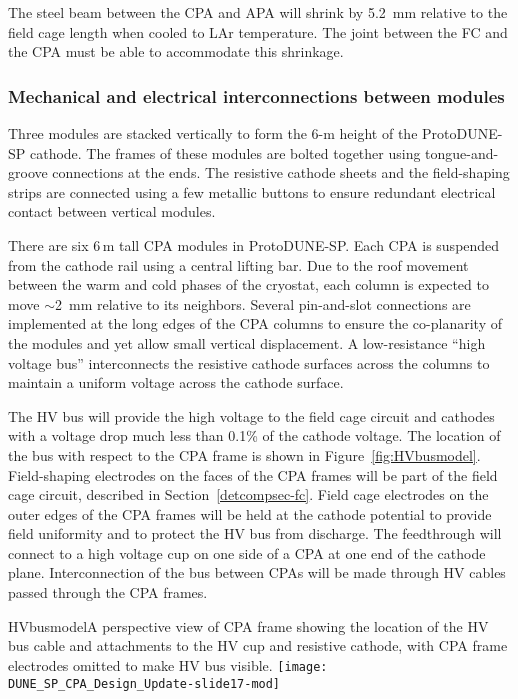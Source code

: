 The steel beam between the CPA and APA will shrink by 5.2~mm relative to the field cage length when cooled to LAr temperature.  The joint between the FC and the CPA must be able to accommodate this shrinkage.



\subsubsection{Mechanical and electrical interconnections between modules}

Three modules are stacked vertically to form the 6-m height of the ProtoDUNE-SP  cathode.  The frames of these modules are bolted together using tongue-and-groove connections at the ends. The resistive cathode sheets and the field-shaping strips are connected using a few metallic buttons to ensure redundant electrical contact between vertical modules.

There are six 6\,m tall CPA modules in  ProtoDUNE-SP.  Each CPA is suspended from the cathode rail using a central lifting bar.  Due to the  roof movement between the warm and cold phases of the cryostat, each column is expected to move $\sim$2~mm relative to its neighbors.  Several pin-and-slot connections are implemented at the long edges of the CPA columns to ensure the co-planarity of the modules and yet allow small vertical displacement.  A low-resistance
``high voltage bus''  interconnects the resistive cathode surfaces across the columns to maintain a uniform voltage across the cathode surface.

The HV bus will provide the high voltage to the field cage
circuit and cathodes with a voltage drop much less than 0.1\% of the
cathode voltage. The location of the bus with respect to the CPA frame is shown in Figure~\ref{fig:HVbusmodel}. Field-shaping electrodes on the faces of the CPA
frames will be part of the field cage circuit, described in Section~\ref{detcompsec-fc}. 
Field cage electrodes on the outer edges of the
CPA frames will be held at the cathode potential to provide field
uniformity and to protect the HV bus from discharge.  The feedthrough
will connect to a high voltage cup on one side of a CPA at one end of
the cathode plane.  Interconnection of the bus between CPAs will be made
through HV cables passed through the CPA frames. 

\begin{cdrfigure}{HVbusmodel}{A perspective view of CPA frame showing the location of the HV bus cable and attachments to the HV cup and resistive cathode, with CPA frame electrodes omitted to make HV bus visible.}
\texttt{[image: DUNE\_SP\_CPA\_Design\_Update-slide17-mod]}
\end{cdrfigure}



